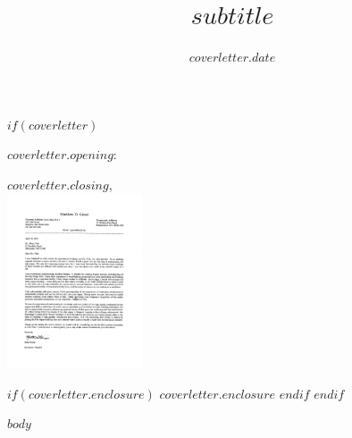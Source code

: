 \documentclass[letterpaper,10pt,final]{moderncv}
\title{$subtitle$}
\begin{document}
$if(coverletter)$
\date{$coverletter.date$}
\opening{$coverletter.opening$:}
\closing{$coverletter.closing$,\\ \includegraphics[width=4cm]{_images/signature} \vspace{-1cm}}
$if(coverletter.enclosure)$
$coverletter.enclosure$
$endif$
$endif$
\makecvtitle

\small
\thispagestyle{empty}

\normalsize

$body$
\end{document}
